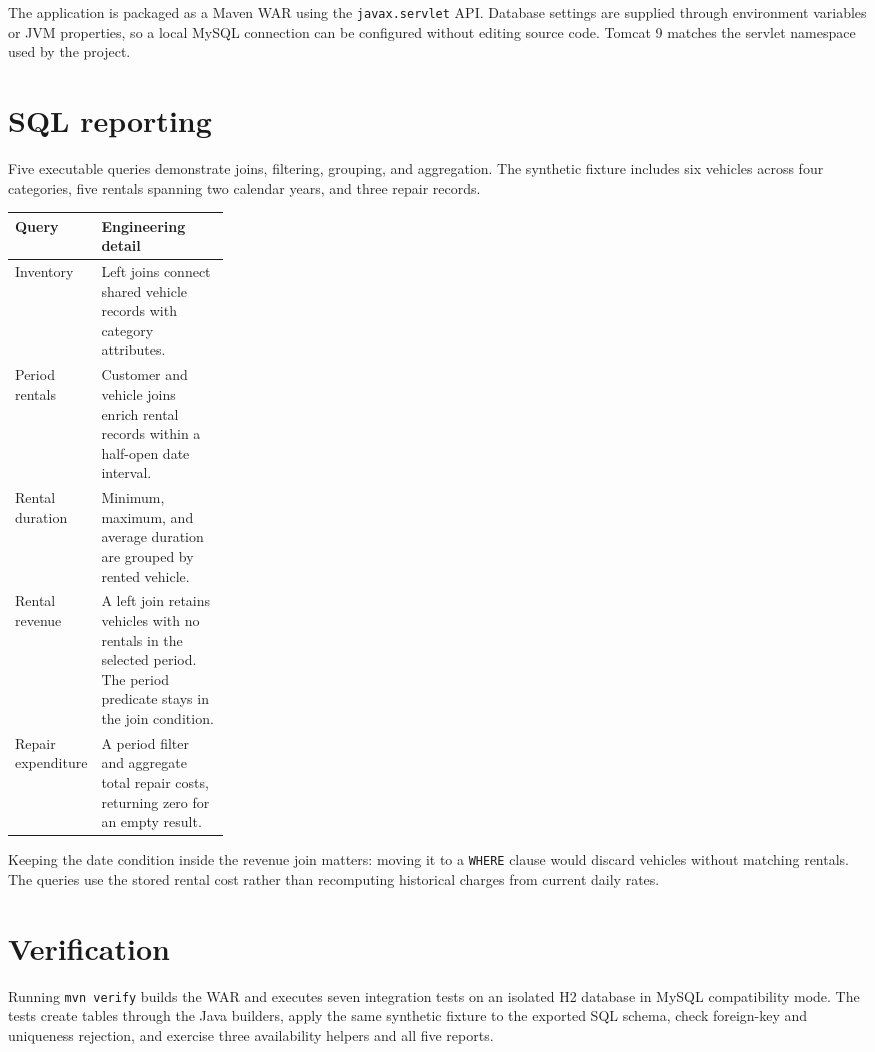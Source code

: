 \documentclass[10pt,a4paper]{article}
\begin{document}
The application is packaged as a Maven WAR using the \texttt{javax.servlet} API. Database settings are supplied through environment variables or JVM properties, so a local MySQL connection can be configured without editing source code. Tomcat 9 matches the servlet namespace used by the project.

\newpage
\section*{SQL reporting}
Five executable queries demonstrate joins, filtering, grouping, and aggregation. The synthetic fixture includes six vehicles across four categories, five rentals spanning two calendar years, and three repair records.

\renewcommand{\arraystretch}{1.25}
\begin{tabularx}{\linewidth}{@{}p{0.25\linewidth}X@{}}
\toprule
Query & Engineering detail \\
\midrule
Inventory & Left joins connect shared vehicle records with category attributes. \\
Period rentals & Customer and vehicle joins enrich rental records within a half-open date interval. \\
Rental duration & Minimum, maximum, and average duration are grouped by rented vehicle. \\
Rental revenue & A left join retains vehicles with no rentals in the selected period. The period predicate stays in the join condition. \\
Repair expenditure & A period filter and aggregate total repair costs, returning zero for an empty result. \\
\bottomrule
\end{tabularx}

Keeping the date condition inside the revenue join matters: moving it to a \texttt{WHERE} clause would discard vehicles without matching rentals. The queries use the stored rental cost rather than recomputing historical charges from current daily rates.

\section*{Verification}
Running \texttt{mvn verify} builds the WAR and executes seven integration tests on an isolated H2 database in MySQL compatibility mode. The tests create tables through the Java builders, apply the same synthetic fixture to the exported SQL schema, check foreign-key and uniqueness rejection, and exercise three availability helpers and all five reports.
\end{document}
